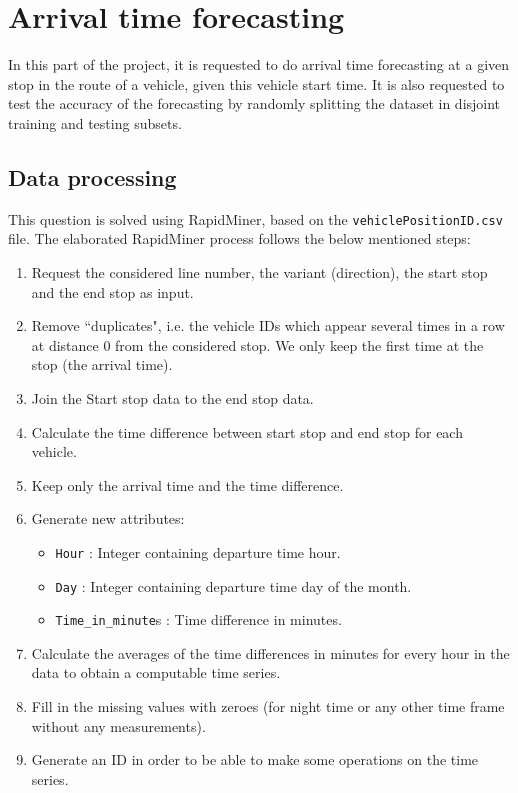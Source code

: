 \documentclass{article}
\begin{document}
\section{Arrival time forecasting}

In this part of the project, it is requested to do arrival time forecasting at a given stop in the route of a vehicle, given this vehicle start time. It is also requested to test the accuracy of the forecasting by randomly splitting the dataset in disjoint training and testing subsets.

\subsection{Data processing}

This question is solved using RapidMiner, based on the \texttt{vehiclePositionID.csv} file. The elaborated RapidMiner process follows the below mentioned steps:

\begin{enumerate}

\item Request the considered line number, the variant (direction), the start stop and the end stop as input.

\item Remove ``duplicates", i.e. the vehicle IDs which appear several times in a row at distance 0 from the considered stop. We only keep the first time at the stop (the arrival time).

\item Join the Start stop data to the end stop data.

\item Calculate the time difference between start stop and end stop for each vehicle.

\item Keep only the arrival time and the time difference.

\item Generate new attributes:
    \begin{itemize}
     \item \texttt{Hour} : Integer containing departure time hour.
     \item \texttt{Day} : Integer containing departure time day of the month.
     \item \texttt{Time\_in\_minute}s : Time difference in minutes.
    \end{itemize}

\item Calculate the averages of the time differences in minutes for every hour in the data to obtain a computable time series.

\item Fill in the missing values with zeroes (for night time or any other time frame without any measurements).

\item Generate an ID in order to be able to make some operations on the time series.

\end{enumerate}
\end{document}
